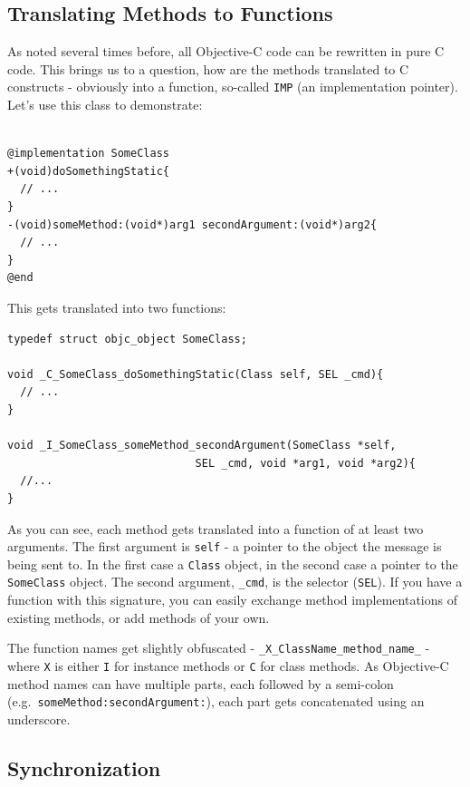 \subsection{Translating Methods to Functions}

As noted several times before, all Objective-C code can be rewritten in pure C code. This brings us to a question, how are the methods translated to C constructs - obviously into a function, so-called \verb=IMP= (an implementation pointer). Let's use this class to demonstrate:

\begin{verbatim}

@implementation SomeClass
+(void)doSomethingStatic{
  // ...
}
-(void)someMethod:(void*)arg1 secondArgument:(void*)arg2{
  // ...
}
@end

\end{verbatim}

This gets translated into two functions:

\begin{verbatim}
typedef struct objc_object SomeClass;

void _C_SomeClass_doSomethingStatic(Class self, SEL _cmd){
  // ...
}

void _I_SomeClass_someMethod_secondArgument(SomeClass *self,
                             SEL _cmd, void *arg1, void *arg2){
  //...
}
\end{verbatim}

As you can see, each method gets translated into a function of at least two arguments. The first argument is \verb=self= - a pointer to the object the message is being sent to. In the first case a \verb=Class= object, in the second case a pointer to the \verb=SomeClass= object. The second argument, \verb=_cmd=, is the selector (\verb=SEL=). If you have a function with this signature, you can easily exchange method implementations of existing methods, or add methods of your own.

The function names get slightly obfuscated - \verb=_X_ClassName_method_name_= - where \verb=X= is either \verb=I= for instance methods or \verb=C= for class methods. As Objective-C method names can have multiple parts, each followed by a semi-colon (e.g.\ \verb=someMethod:secondArgument:=), each part gets concatenated using an underscore.

\subsection{Synchronization}

